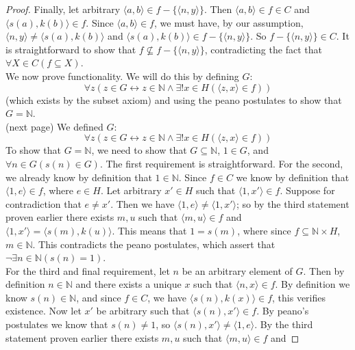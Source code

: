 \documentclass{report}
\begin{document}
\begin{proof}
Finally, let arbitrary $\langle a,b\rangle\in f-\{\langle n,y\rangle\}$. Then $\langle a,b\rangle\in f\in C$ and $\langle s(a),k(b)\rangle\in f$.
Since $\langle a,b\rangle\in f$, we must have, by our assumption, $\langle n,y\rangle\neq\langle s(a),k(b)\rangle$ and $\langle s(a),k(b)\rangle\in f-\{\langle n,y\rangle\}$. 
So $f-\{\langle n,y\rangle\}\in C$. It is straightforward to show that $f\nsubseteq f-\{\langle n,y\rangle\}$, contradicting the fact that $\forall X\in C(f\subseteq X)$.\\
\indent We now prove functionality. We will do this by defining $G$:
\begin{equation*}
\forall z(z\in G\leftrightarrow z\in\mathbb N\land\exists!x\in H(\langle z,x\rangle\in f))
\end{equation*}
(which exists by the subset axiom) and using the peano postulates to show that $G=\mathbb N$.\\
(next page)\newpage
We defined $G$:
\begin{equation*}
\forall z(z\in G\leftrightarrow z\in\mathbb N\land\exists!x\in H(\langle z,x\rangle\in f))
\end{equation*}
To show that $G=\mathbb N$, we need to show that $G\subseteq\mathbb N$, $1\in G$, and $\forall n\in G(s(n)\in G)$. The first requirement is straightforward. 
For the second, we already know by definition that $1\in\mathbb N$. Since $f\in C$ we know by definition that $\langle 1,e\rangle\in f$, where $e\in H$. 
Let arbitrary $x'\in H$ such that $\langle 1,x'\rangle\in f$. Suppose for contradiction that $e\neq x'$. Then we have $\langle 1,e\rangle\neq\langle 1,x'\rangle$; so by the third statement proven
earlier there exists $m,u$ such that $\langle m,u\rangle\in f$ and $\langle 1,x'\rangle=\langle s(m),k(u)\rangle$. 
This means that $1=s(m)$, where since $f\subseteq\mathbb N\times H$, $m\in\mathbb N$. This contradicts the peano postulates, which assert that 
$\neg\exists n\in\mathbb N(s(n)=1)$.\\
\indent For the third and final requirement, let $n$ be an arbitrary element of $G$. Then by definition $n\in\mathbb N$ and there exists a unique $x$ such that $\langle n,x\rangle\in f$. 
By definition we know $s(n)\in\mathbb N$, and 
since $f\in C$, we have $\langle s(n),k(x)\rangle\in f$, this verifies existence. Now let $x'$ be arbitrary such that $\langle s(n),x'\rangle\in f$. By peano's postulates we know that $s(n)\neq 1$,
so $\langle s(n),x'\rangle\neq\langle 1,e\rangle$. By the third statement proven earlier there exists $m,u$ such that $\langle m,u\rangle\in f$ and 

\end{proof}
\end{document}
